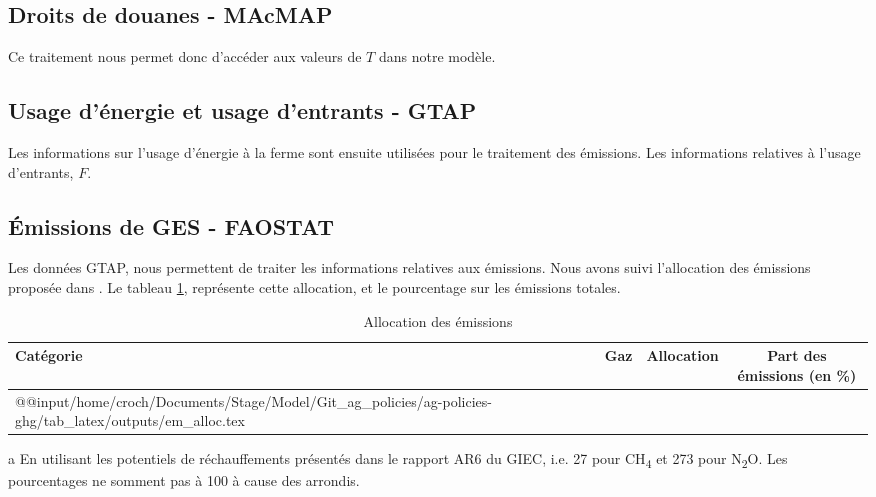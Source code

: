 \subsection{Droits de douanes - MAcMAP}

Ce traitement nous permet donc d'accéder aux valeurs de $T$ dans notre modèle.


\subsection{Usage d'énergie et usage d'entrants - GTAP}

Les informations sur l'usage d'énergie à la ferme sont ensuite utilisées pour le traitement des émissions. Les informations relatives à l'usage d'entrants, $F$.


\subsection{Émissions de GES - FAOSTAT}

Les données GTAP, nous permettent de traiter les informations relatives aux émissions. Nous avons suivi l'allocation des émissions proposée dans \cite{Valin2023}. Le tableau \ref{tab:em_allocation}, représente cette allocation, et le pourcentage sur les émissions totales.

\begin{table}[h]
    \centering
    \begin{threeparttable}
        \begin{tabularx}{\textwidth}{p{1.5in}p{1.2in}p{1.2in}c}
            \textbf{Catégorie} & \textbf{Gaz} & \textbf{Allocation} & \textbf{Part des émissions}\tnote{a} (en \%) \\ \hline
            \csname @@input\endcsname /home/croch/Documents/Stage/Model/Git_ag_policies/ag-policies-ghg/tab_latex/outputs/em_alloc.tex
            \hline
        \end{tabularx}
        \begin{tablenotes}
            \footnotesize
            \item[a] En utilisant les potentiels de réchauffements présentés dans le rapport AR6 du GIEC, i.e. 27 pour CH\textsubscript{4} et 273 pour N\textsubscript{2}O. Les pourcentages ne somment pas à 100 à cause des arrondis.
        \end{tablenotes}
        \caption{Allocation des émissions}
        \label{tab:em_allocation}
    \end{threeparttable}
\end{table}

